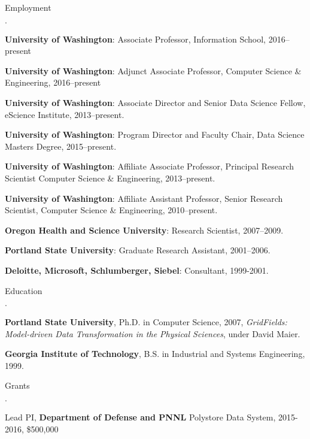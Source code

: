 \documentclass[10pt]{article}
\newcommand{\ptitle}{\em}
\newenvironment{bulletlist}
   {
      \begin{list}
         {$\cdot$}
         {
            \setlength{\itemsep}{.5ex}
            \setlength{\parsep}{0ex}
            \setlength{\leftmargin}{0.7em}
            \setlength{\parskip}{0ex}
            \setlength{\topsep}{0ex}
         }
   }
   {
      \end{list}
   }
\newcommand{\marginlabel}[1]{
\begin{minipage}[b]{0.8\labelwidth}{\large \textsf{\textbf{#1}}}\end{minipage}}
\newcommand{\entrylabel}[1]{\mbox{\marginlabel{#1}}\hfill}
\newcommand{\MainListlabel}[1]
   {
      \parbox[t]{\labelwidth}{\hspace{.8em}\marginlabel{#1}}
   }
\newenvironment{MainList}[1]
   {
      \renewcommand{\entrylabel}{\MainListlabel}
      \begin{list}{}
      {
         \renewcommand{\makelabel}{\entrylabel}
         \setlength   {\itemindent}{-.65em}
         \setlength   {\labelwidth}{#1}
         \setlength   {\leftmargin}{\labelwidth}
         \setlength   {\itemsep}{3ex}
      }
   }
   {
      \end{list}
   }
\begin{document}
\begin{MainList}{88pt}

\item [Employment]
\begin{bulletlist}
\item {\bf University of Washington}: Associate Professor, Information School, 2016--present
\item {\bf University of Washington}: Adjunct Associate Professor, Computer Science & Engineering, 2016--present
\item {\bf University of Washington}: Associate Director and Senior Data Science Fellow, eScience Institute, 2013--present.
\item {\bf University of Washington}: Program Director and Faculty Chair, Data Science Masters Degree, 2015--present.
\item {\bf University of Washington}: Affiliate Associate Professor, Principal Research Scientist
Computer Science \& Engineering, 2013--present.
\item {\bf University of Washington}: Affiliate Assistant Professor, Senior Research Scientist,
Computer Science \& Engineering, 2010--present.
\item {\bf Oregon Health and Science University}: Research Scientist, 2007--2009.
\item {\bf Portland State University}: Graduate Research Assistant, 2001--2006.
\item {\bf Deloitte, Microsoft, Schlumberger, Siebel}: Consultant, 1999-2001.

\end{bulletlist}

\item [Education]
\begin{bulletlist}
\item {\bf Portland State University},
      Ph.D. in Computer Science, 2007,
{\ptitle GridFields: Model-driven Data Transformation in the Physical Sciences},
under David Maier.
\item {\bf Georgia Institute of Technology},
     B.S. in Industrial and Systems Engineering, 1999.
\end{bulletlist}

\item [Grants]
\begin{bulletlist}

\item Lead PI, {\bf Department of Defense and PNNL} Polystore Data System, 2015-2016, \$500,000


\end{bulletlist}
\end{MainList}
\end{document}
